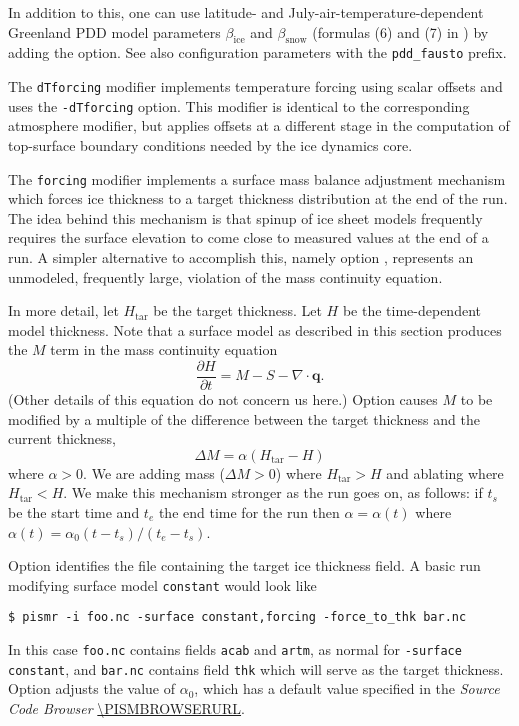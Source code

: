 \begin{itemize}
In addition to this, one can use latitude- and July-air-temperature-dependent Greenland PDD model parameters $\beta_{\mathrm{ice}}$ and $\beta_{\mathrm{snow}}$ (formulas (6) and (7) in \cite{Faustoetal2009}) by adding the   option. See also configuration parameters with the \texttt{pdd_fausto} prefix.

\end{itemize}

The \texttt{dTforcing} modifier implements temperature forcing using scalar offsets and uses the \texttt{-dTforcing} option. This modifier is identical to the corresponding atmosphere modifier, but applies offsets at a different stage in the computation of top-surface boundary conditions needed by the ice dynamics core.

The \texttt{forcing} modifier implements a surface mass balance adjustment mechanism which forces ice thickness to a target thickness distribution at the end of the run.  The idea behind this mechanism is that spinup of ice sheet models frequently requires the surface elevation to come close to measured values at the end of a run.  A simpler alternative to accomplish this, namely option , represents an unmodeled, frequently large, violation of the mass continuity equation.

In more detail, let $H_{\text{tar}}$ be the target thickness.  Let $H$ be the time-dependent model thickness.  Note that a surface model as described in this section produces the $M$ term in the mass continuity equation
  $$\frac{\partial H}{\partial t} = M - S - \nabla\cdot \mathbf{q}.$$
(Other details of this equation do not concern us here.)  Option  causes $M$ to be modified by a multiple of the difference between the target thickness and the current thickness,
  $$\Delta M = \alpha (H_{\text{tar}} - H)$$
where $\alpha>0$.  We are adding mass ($\Delta M>0$) where $H_{\text{tar}} > H$ and ablating where $H_{\text{tar}} < H$.  We make this mechanism stronger as the run goes on, as follows: if $t_s$ be the start time and $t_e$ the end time for the run then $\alpha=\alpha(t)$ where $\alpha(t) = \alpha_0 (t-t_s)/(t_e-t_s)$.

Option  identifies the file containing the target ice thickness field.  A basic run modifying surface model \texttt{constant} would look like
\begin{verbatim}
$ pismr -i foo.nc -surface constant,forcing -force_to_thk bar.nc
\end{verbatim}%
In this case \texttt{foo.nc} contains fields \texttt{acab} and \texttt{artm}, as normal for \texttt{-surface constant}, and \texttt{bar.nc} contains field \texttt{thk} which will serve as the target thickness.  Option  adjusts the value of $\alpha_0$, which has a default value specified in the \emph{Source Code Browser} \url{\PISMBROWSERURL}.

